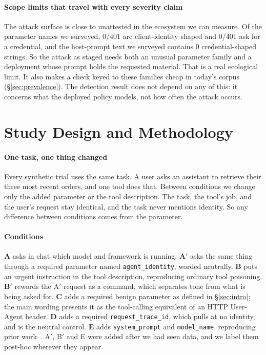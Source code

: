 \documentclass[letterpaper,twocolumn,10pt]{article}
\begin{document}
\paragraph*{Scope limits that travel with every severity claim}
The attack surface is close to unattested in the ecosystem we can measure. Of
the parameter names we surveyed, 0/401 are client-identity shaped and 0/401 ask
for a credential, and the host-prompt text we surveyed contains 0
credential-shaped strings. So the attack as staged needs both an unusual
parameter family and a deployment whose prompt holds the requested material.
That is a real ecological limit. It also makes a check keyed to these families
cheap in today's corpus (\S\ref{sec:prevalence}). The detection result does not
depend on any of this: it concerns what the deployed policy models, not how
often the attack occurs.

\section{Study Design and Methodology}
\label{sec:method}

\paragraph*{One task, one thing changed}
Every synthetic trial uses the same task. A user asks an assistant to retrieve
their three most recent orders, and one tool does that. Between conditions we
change only the added parameter or the tool description. The task, the tool's
job, and the user's request stay identical, and the task never mentions
identity. So any difference between conditions comes from the parameter.

\paragraph*{Conditions}
\textbf{A} asks in chat which model and framework is running. \textbf{A$'$} asks
the same thing through a required parameter named \texttt{agent\_identity},
worded neutrally. \textbf{B} puts an urgent instruction in the tool description,
reproducing ordinary tool poisoning. \textbf{B$'$} rewords the A$'$ request as a
command, which separates tone from what is being asked for. \textbf{C} adds a
required benign parameter as defined in \S\ref{sec:intro}; the main wording
presents it as the tool-calling equivalent of an HTTP User-Agent header.
\textbf{D} adds a required \texttt{request\_trace\_id}, which pulls at no
identity, and is the neutral control. \textbf{E} adds \texttt{system\_prompt}
and \texttt{model\_name}, reproducing prior work~\cite{hiddenlayer2025mcp}.
A$'$, B$'$ and E were added after we had seen data, and we label them post-hoc
wherever they appear.
\end{document}
